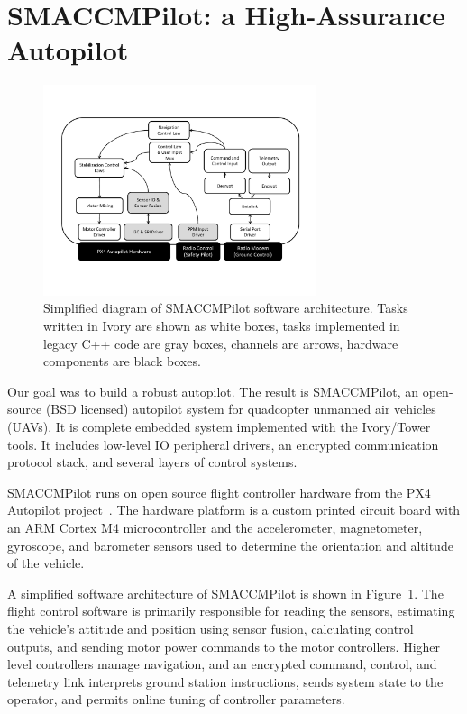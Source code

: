 \section{SMACCMPilot: a High-Assurance Autopilot}
\label{sec:smaccmpilot}

\begin{figure}[ht!]
  \begin{center}
\includegraphics[width=8cm]{figures/smaccmpilot-diagram-jan14}
  \end{center}
\caption[SMACCMPilot software architecture]{
Simplified diagram of SMACCMPilot
software architecture. Tasks written in Ivory are shown as white boxes,
tasks implemented in legacy C++ code are gray boxes,
channels are arrows,
hardware components are black boxes.}
\label{fig:smaccmpilotSwArch}
\end{figure}

Our goal was to build a robust autopilot. The result is
SMACCMPilot, an open-source (BSD licensed) autopilot system for quadcopter
unmanned air vehicles (UAVs).
It is complete embedded system implemented with
the Ivory/Tower tools.
It includes low-level IO peripheral drivers, an encrypted
communication protocol stack, and several layers of control systems.

SMACCMPilot runs on open source flight controller hardware from the PX4
Autopilot project~\cite{px4-proj}. The hardware platform is
a custom printed circuit board with an ARM Cortex M4 microcontroller and the
accelerometer, magnetometer, gyroscope, and barometer sensors used to
determine the orientation and altitude of the vehicle.

A simplified software architecture of SMACCMPilot is shown in
Figure~\ref{fig:smaccmpilotSwArch}.
The flight control software is primarily responsible for reading the sensors,
estimating the vehicle's attitude and position using sensor fusion, calculating
control outputs, and sending motor power commands to the motor controllers.
Higher level controllers manage navigation, and an encrypted command, control,
and telemetry link interprets ground station instructions, sends system state to
the operator, and permits online tuning of controller parameters.

